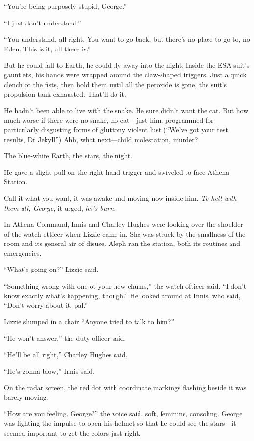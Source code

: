 ``You're being purposely stupid, George.''

``I just don't understand.''

``You understand, all right. You want to go back, but there's no place to go to, no Eden. This is it, all there is.''

But he could fall to Earth, he could fly away into the night. Inside the ESA suit's gauntlets, his hands were wrapped around the claw-shaped triggers. Just a quick clench ot the fists, then hold them until all the peroxide is gone, the suit's propulsion tank exhausted. That'll do it.

He hadn't been able to live with the snake. He sure didn't want the cat. But how much worse if there were no snake, no cat—just him, programmed for particularly disgusting forms of gluttony violent lust (``We've got your test results, Dr Jekyll'') Ahh, what next—child molestation, murder?

The blue-white Earth, the stars, the night.

He gave a slight pull on the right-hand trigger and swiveled to face Athena Station.

Call it what you want, it was awake and moving now inside him. \textit{To hell with them all, George}, it urged, \textit{let's burn.}

In Athena Command, Innis and Charley Hughes were looking over the shoulder of the watch otticer when Lizzie came in. She was struck by the smallness of the room and its general air of disuse. Aleph ran the station, both its routines and emergencies.

``What's going on?'' Lizzie said.

``Something wrong with one ot your new chums,'' the watch ofticer said. ``I don't know exactly what's happening, though.'' He looked around at Innis, who said, ``Don't worry about it, pal.''

Lizzie slumped in a chair ``Anyone tried to talk to him?''

``He won't answer,'' the duty officer said.

``He'll be all right,'' Charley Hughes said.

``He's gonna blow,'' Innis said.

On the radar screen, the red dot with coordinate markings flashing beside it was barely moving.

``How are you feeling, George?'' the voice said, soft, feminine, consoling. George was fighting the impulse to open his helmet so that he could see the stars—it seemed important to get the colors just right.

